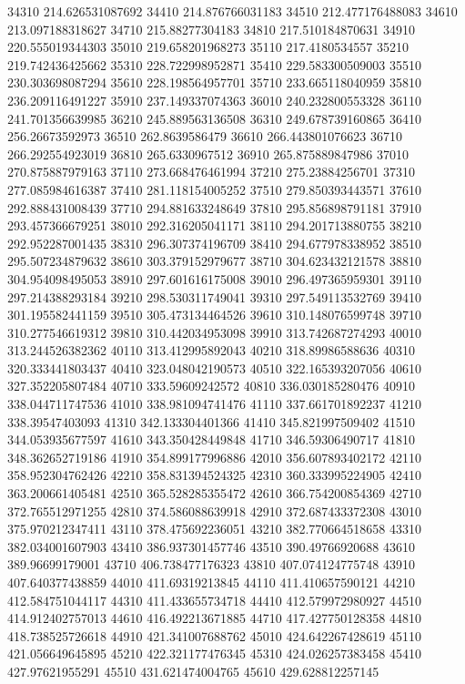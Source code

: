 {34310 214.626531087692
34410 214.876766031183
34510 212.477176488083
34610 213.097188318627
34710 215.88277304183
34810 217.510184870631
34910 220.555019344303
35010 219.658201968273
35110 217.4180534557
35210 219.742436425662
35310 228.722998952871
35410 229.583300509003
35510 230.303698087294
35610 228.198564957701
35710 233.665118040959
35810 236.209116491227
35910 237.149337074363
36010 240.232800553328
36110 241.701356639985
36210 245.889563136508
36310 249.678739160865
36410 256.26673592973
36510 262.8639586479
36610 266.443801076623
36710 266.292554923019
36810 265.6330967512
36910 265.875889847986
37010 270.875887979163
37110 273.668476461994
37210 275.23884256701
37310 277.085984616387
37410 281.118154005252
37510 279.850393443571
37610 292.888431008439
37710 294.881633248649
37810 295.856898791181
37910 293.457366679251
38010 292.316205041171
38110 294.201713880755
38210 292.952287001435
38310 296.307374196709
38410 294.677978338952
38510 295.507234879632
38610 303.379152979677
38710 304.623432121578
38810 304.954098495053
38910 297.601616175008
39010 296.497365959301
39110 297.214388293184
39210 298.530311749041
39310 297.549113532769
39410 301.195582441159
39510 305.473134464526
39610 310.148076599748
39710 310.277546619312
39810 310.442034953098
39910 313.742687274293
40010 313.244526382362
40110 313.412995892043
40210 318.89986588636
40310 320.333441803437
40410 323.048042190573
40510 322.165393207056
40610 327.352205807484
40710 333.59609242572
40810 336.030185280476
40910 338.044711747536
41010 338.981094741476
41110 337.661701892237
41210 338.39547403093
41310 342.133304401366
41410 345.821997509402
41510 344.053935677597
41610 343.350428449848
41710 346.59306490717
41810 348.362652719186
41910 354.899177996886
42010 356.607893402172
42110 358.952304762426
42210 358.831394524325
42310 360.333995224905
42410 363.200661405481
42510 365.528285355472
42610 366.754200854369
42710 372.765512971255
42810 374.586088639918
42910 372.687433372308
43010 375.970212347411
43110 378.475692236051
43210 382.770664518658
43310 382.034001607903
43410 386.937301457746
43510 390.49766920688
43610 389.96699179001
43710 406.738477176323
43810 407.074124775748
43910 407.640377438859
44010 411.69319213845
44110 411.410657590121
44210 412.584751044117
44310 411.433655734718
44410 412.579972980927
44510 414.912402757013
44610 416.492213671885
44710 417.427750128358
44810 418.738525726618
44910 421.341007688762
45010 424.642267428619
45110 421.056649645895
45210 422.321177476345
45310 424.026257383458
45410 427.97621955291
45510 431.621474004765
45610 429.628812257145
}
